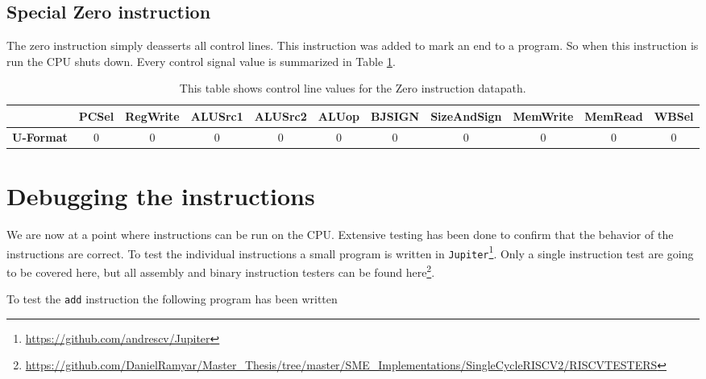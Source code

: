     \subsection{Special Zero instruction}
        The zero instruction simply deasserts all control lines. This instruction was added to mark an end to a program. So when this instruction is run the CPU shuts down. Every control signal value is summarized in Table \ref{table:ZEROFORMAT}. 
        
        \begin{table}[h!]
            \small
            \hspace{-2.4cm}
            \begin{tabular}{|c||c|c|c|c|c|c|c|c|c|c|}
                \hline
                & \textbf{PCSel} & \textbf{RegWrite} & \textbf{ALUSrc1} & \textbf{ALUSrc2} & \textbf{ALUop} & \textbf{BJSIGN} & \textbf{SizeAndSign} & \textbf{MemWrite} & \textbf{MemRead} & \textbf{WBSel} \\ \hline\hline
                \textbf{U-Format} &       0        &         0         &        0         &        0         &       0        &        0        &          0           &         0         &        0         &       0        \\ \hline
            \end{tabular}
            \caption{This table shows control line values for the Zero instruction datapath.}
            \label{table:ZEROFORMAT}
        \end{table} 
    
    
\section{Debugging the instructions}
    We are now at a point where instructions can be run on the CPU. Extensive testing has been done to confirm that the behavior of the instructions are correct. To test the individual instructions a small program is written in \texttt{Jupiter}\footnote{\url{https://github.com/andrescv/Jupiter}}. Only a single instruction test are going to be covered here, but all assembly and binary instruction testers can be found here\footnote{\url{https://github.com/DanielRamyar/Master_Thesis/tree/master/SME_Implementations/SingleCycleRISCV2/RISCVTESTERS}}.
    
    To test the \texttt{add} instruction the following program has been written
    

